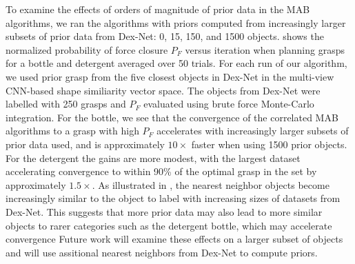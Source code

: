 To examine the effects of orders of magnitude of prior data in the MAB algorithms, we ran the algorithms with priors computed from increasingly larger subsets of prior data from Dex-Net: 0, 15, 150, and 1500 objects. 
 shows the normalized probability of force closure $P_F$ versus iteration when planning grasps for a bottle and detergent averaged over 50 trials.
For each run of our algorithm, we used prior grasp from the five closest objects in Dex-Net in the multi-view CNN-based shape similiarity vector space.
The objects from Dex-Net were labelled with 250 grasps and $P_F$ evaluated using brute force Monte-Carlo integration.
For the bottle, we see that the convergence of the correlated MAB algorithms to a grasp with high $P_F$ accelerates with increasingly larger subsets of prior data used, and is approximately $10 \times$ faster when using 1500 prior objects.
For the detergent the gains are more modest, with the largest dataset accelerating convergence to within 90\% of the optimal grasp in the set by approximately $1.5 \times$.
As illustrated in , the nearest neighbor objects become increasingly similar to the object to label with increasing sizes of datasets from Dex-Net.
This suggests that more prior data may also lead to more similar objects to rarer categories such as the detergent bottle, which may accelerate convergence 
Future work will examine these effects on a larger subset of objects and will use assitional nearest neighbors from Dex-Net to compute priors.

